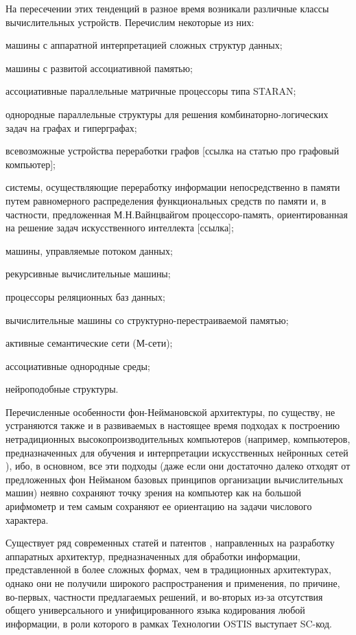 На пересечении этих тенденций в разное время возникали различные классы вычислительных устройств. Перечислим некоторые из них:
\begin{textitemize}
\item машины с аппаратной интерпретацией сложных структур данных;
\item машины с развитой ассоциативной памятью;
\item ассоциативные параллельные матричные процессоры типа STARAN;
\item однородные параллельные структуры для решения комбинаторно-логических задач на графах и гиперграфах; %
\item всевозможные устройства переработки графов [ссылка на статью про графовый компьютер];
\item системы, осуществляющие переработку информации непосредственно в памяти путем равномерного распределения функциональных средств по памяти и, в частности, предложенная М.Н.Вайнцвайгом процессоро-память, ориентированная на решение задач искусственного интеллекта [ссылка]; %
\item машины, управляемые потоком данных;
\item рекурсивные вычислительные машины;
\item процессоры реляционных баз данных;
\item вычислительные машины со структурно-перестраиваемой памятью;
\item активные семантические сети (М-сети);
\item ассоциативные однородные среды;
\item нейроподобные структуры.
\end{textitemize}

Перечисленные особенности фон-Неймановской архитектуры, по существу, не устраняются также и в развиваемых в настоящее время подходах к построению нетрадиционных высокопроизводительных компьютеров (например, компьютеров, предназначенных для обучения и интерпретации искусственных нейронных сетей \cite{Neurocomputers,USB_Accelerator}), ибо, в основном, все эти подходы (даже если они достаточно далеко отходят от предложенных фон Нейманом базовых принципов организации вычислительных машин) неявно сохраняют точку зрения на компьютер как на большой арифмометр и тем самым сохраняют ее ориентацию на задачи числового характера.

Существует ряд современных статей  \cite{Tran2018,Shi2018,Lu2021,Afanasyev2021,Zhang2017,Hu2021,Minati2019,Song2016} и патентов \cite{Somsubhra_2006,Allen_1989,Moussa_2013}, направленных на разработку аппаратных архитектур, предназначенных для обработки информации, представленной в более сложных формах, чем в традиционных архитектурах, однако они не получили широкого распространения и применения, по причине, во-первых, частности предлагаемых решений, и во-вторых из-за отсутствия общего универсального и унифицированного языка кодирования любой информации, в роли которого в рамках Технологии OSTIS выступает SC-код.

